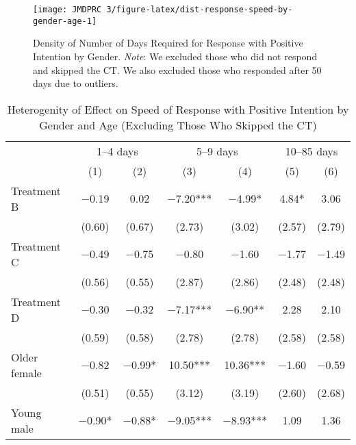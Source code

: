 \documentclass[12pt, a4paper]{article}
\begin{document}
\begin{figure}[H]
\texttt{[image: JMDPRC~3/figure-latex/dist-response-speed-by-gender-age-1]} \caption{Density of Number of Days Required for Response with Positive Intention by Gender. \newline \emph{Note}: We excluded those who did not respond and skipped the CT. We also excluded those who responded after 50 days due to outliers.}\label{fig:dist-response-speed-by-gender-age}
\end{figure}

\begin{table}[H]

\caption{\label{tab:lm-interaction-gender-age-int-time-decompose-noskip}Heterogenity of Effect on Speed of Response with Positive Intention by Gender and Age (Excluding Those Who Skipped the CT)}
\centering
\fontsize{8}{10}\selectfont
\begin{threeparttable}
\begin{tabular}[t]{lcccccc}
\toprule
\multicolumn{1}{c}{ } & \multicolumn{2}{c}{1--4 days} & \multicolumn{2}{c}{5--9 days} & \multicolumn{2}{c}{10--85 days} \\
\cmidrule(l{3pt}r{3pt}){2-3} \cmidrule(l{3pt}r{3pt}){4-5} \cmidrule(l{3pt}r{3pt}){6-7}
  & (1) & (2) & (3) & (4) & (5) & (6)\\
\midrule
Treatment B & \num{-0.19} & \num{0.02} & \num{-7.20}*** & \num{-4.99}* & \num{4.84}* & \num{3.06}\\
 & (\num{0.60}) & (\num{0.67}) & (\num{2.73}) & (\num{3.02}) & (\num{2.57}) & (\num{2.79})\\
Treatment C & \num{-0.49} & \num{-0.75} & \num{-0.80} & \num{-1.60} & \num{-1.77} & \num{-1.49}\\
 & (\num{0.56}) & (\num{0.55}) & (\num{2.87}) & (\num{2.86}) & (\num{2.48}) & (\num{2.48})\\
Treatment D & \num{-0.30} & \num{-0.32} & \num{-7.17}*** & \num{-6.90}** & \num{2.28} & \num{2.10}\\
 & (\num{0.59}) & (\num{0.58}) & (\num{2.78}) & (\num{2.78}) & (\num{2.58}) & (\num{2.58})\\
Older female & \num{-0.82} & \num{-0.99}* & \num{10.50}*** & \num{10.36}*** & \num{-1.60} & \num{-0.59}\\
 & (\num{0.51}) & (\num{0.55}) & (\num{3.12}) & (\num{3.19}) & (\num{2.60}) & (\num{2.68})\\
Young male & \num{-0.90}* & \num{-0.88}* & \num{-9.05}*** & \num{-8.93}*** & \num{1.09} & \num{1.36}\\

\end{tabular}
\end{threeparttable}
\end{table}
\end{document}

